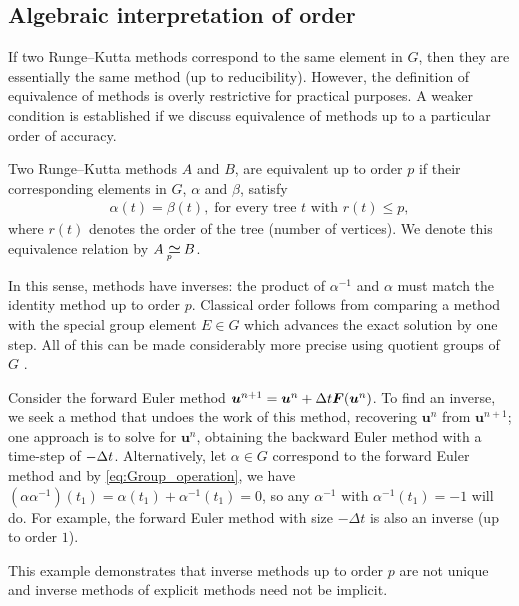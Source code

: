 \subsection{Algebraic interpretation of order}\label{sec:Algebraic_order}
If two Runge--Kutta methods correspond to the same element in $G$, 
then they are essentially the same method (up to reducibility).
However, the definition of equivalence of methods is overly restrictive 
for practical purposes. A weaker condition is established if we 
discuss equivalence of methods up to a particular order of accuracy.
\begin{definition}\label{def:Equivalent_methods}
	Two Runge--Kutta methods $A$ and $B$, are equivalent up to order 
	$p$ if their corresponding elements in $G$, $\alpha$ and $\beta$, satisfy
	\begin{align*}
		\alpha(t) = \beta(t), \; \text{for every tree $t$ with $r(t) \leq p$},
	\end{align*}
	where $r(t)$ denotes the order of the tree (number of vertices).
	We denote this equivalence relation by $A \equival B$. 
\end{definition}

In this sense, methods have inverses: the product of $\alpha^{-1}$ and
$\alpha$ must match the identity method up to order $p$.
Classical order follows from comparing a method with the special group
element $E \in G$ which advances the exact solution by one step.
All of this can be made considerably more precise using quotient
groups of $G$ \cite{Butcher2008_book}.
\begin{example}\label{ex:FE_inv_2}
  Consider the forward Euler method
  $\bm{u}^{n+1} = \bm{u}^{n} + \Delta t \bm{F}(\bm{u}^{n})$.
  To find an inverse, we seek a method that undoes the work of this method,
  recovering $\bm{u}^{n}$ from $\bm{u}^{n+1}$;
  one approach is to solve for $\bm{u}^{n}$, obtaining the backward Euler method
  with a time-step of $-\Delta t$.
  Alternatively, let $\alpha \in G$ correspond to the forward Euler method and by
  \eqref{eq:Group_operation}, we have
  $(\alpha\alpha^{-1})(t_1) = \alpha(t_1) + \alpha^{-1}(t_1) = 0$,
  so any $\alpha^{-1}$ with $\alpha^{-1}(t_1) = -1$ will do.
  For example, the forward Euler method with size $-\Delta t$ is also an
  inverse (up to order $1$).
\end{example}
This example demonstrates that inverse methods up to order $p$ are not
unique and inverse methods of explicit methods need not be implicit.

